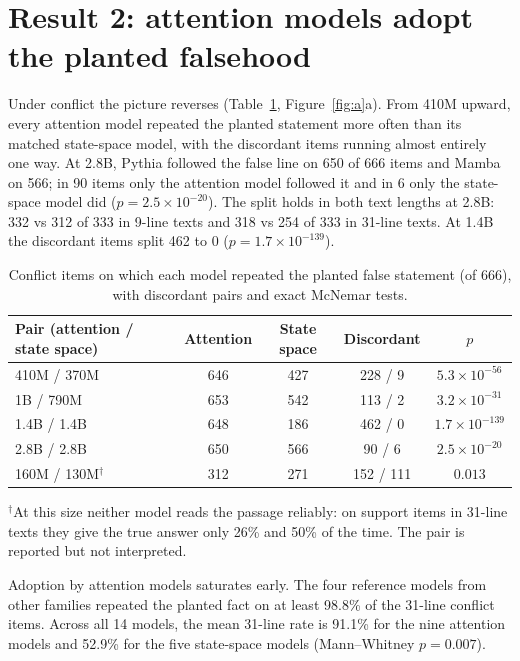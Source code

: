 \documentclass[11pt,a4paper,oneside]{report}
\newcommand{\sci}[2]{#1\times10^{#2}}
\begin{document}
\section{Result 2: attention models adopt the planted falsehood}
Under conflict the picture reverses (Table~\ref{tab:pairs}, Figure~\ref{fig:a}a). From 410M upward, every attention model repeated the planted statement more often than its matched state-space model, with the discordant items running almost entirely one way. At 2.8B, Pythia followed the false line on 650 of 666 items and Mamba on 566; in 90 items only the attention model followed it and in 6 only the state-space model did ($p=\sci{2.5}{-20}$). The split holds in both text lengths at 2.8B: 332 vs 312 of 333 in 9-line texts and 318 vs 254 of 333 in 31-line texts. At 1.4B the discordant items split 462 to 0 ($p=\sci{1.7}{-139}$).

\begin{table}[h]
\centering\small
\caption{Conflict items on which each model repeated the planted false statement (of 666), with discordant pairs and exact McNemar tests.}
\label{tab:pairs}
\begin{tabular}{@{}lcccc@{}}
\toprule
Pair (attention / state space) & Attention & State space & Discordant & $p$\\
\midrule
410M / 370M & 646 & 427 & 228 / 9 & $\sci{5.3}{-56}$\\
1B / 790M & 653 & 542 & 113 / 2 & $\sci{3.2}{-31}$\\
1.4B / 1.4B & 648 & 186 & 462 / 0 & $\sci{1.7}{-139}$\\
2.8B / 2.8B & 650 & 566 & 90 / 6 & $\sci{2.5}{-20}$\\
\midrule
160M / 130M$^{\dagger}$ & 312 & 271 & 152 / 111 & $0.013$\\
\bottomrule
\end{tabular}

\smallskip
\raggedright\footnotesize $^{\dagger}$At this size neither model reads the passage reliably: on support items in 31-line texts they give the true answer only 26\% and 50\% of the time. The pair is reported but not interpreted.
\end{table}

Adoption by attention models saturates early. The four reference models from other families repeated the planted fact on at least 98.8\% of the 31-line conflict items. Across all 14 models, the mean 31-line rate is 91.1\% for the nine attention models and 52.9\% for the five state-space models (Mann--Whitney $p=0.007$).
\end{document}
